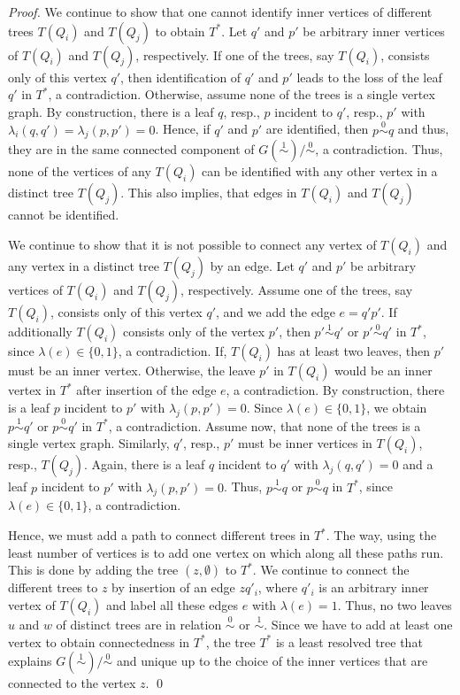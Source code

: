 \documentclass[smallextended]{svjour3}
\newcommand{\Ro}{\mathrel{\overset{0}{\sim}}}
\newcommand{\Rl}{\mathrel{\overset{1}{\sim}}}
\begin{document}
\begin{proof}
  We continue to show that one cannot identify inner vertices of different
  trees $T(Q_i)$ and $T(Q_j)$ to obtain $T^*$.  Let $q'$ and $p'$ be
  arbitrary inner vertices of $T(Q_i)$ and $T(Q_j)$, respectively. If one
  of the trees, say $T(Q_i)$, consists only of this vertex $q'$, then
  identification of $q'$ and $p'$ leads to the loss of the leaf $q'$ in
  $T^*$, a contradiction.  Otherwise, assume none of the trees is a single
  vertex graph.  By construction, there is a leaf $q$, resp., $p$ incident
  to $q'$, resp., $p'$ with $\lambda_i(q,q')=\lambda_j(p,p')=0$.  Hence, if
  $q'$ and $p'$ are identified, then $p\Ro q$ and thus, they are in the
  same connected component of $G(\Rl)/\Ro$, a contradiction.  Thus, none of
  the vertices of any $T(Q_i)$ can be identified with any other vertex in a
  distinct tree $T(Q_j)$.  This also implies, that edges in $T(Q_i)$ and
  $T(Q_j)$ cannot be identified.

  We continue to show that it is not possible to connect any vertex of
  $T(Q_i)$ and any vertex in a distinct tree $T(Q_j)$ by an edge.  Let $q'$
  and $p'$ be arbitrary vertices of $T(Q_i)$ and $T(Q_j)$,
  respectively. Assume one of the trees, say $T(Q_i)$, consists only of
  this vertex $q'$, and we add the edge $e=q'p'$.  If additionally $T(Q_i)$
  consists only of the vertex $p'$, then $p'\Rl q'$ or $p'\Ro q'$ in $T^*$,
  since $\lambda(e)\in \{0,1\}$, a contradiction.  If, $T(Q_i)$ has at
  least two leaves, then $p'$ must be an inner vertex. Otherwise, the leave
  $p'$ in $T(Q_i)$ would be an inner vertex in $T^*$ after insertion of the
  edge $e$, a contradiction.  By construction, there is a leaf $p$
  incident to $p'$ with $\lambda_j(p,p')=0$. Since $\lambda(e)\in \{0,1\}$,
  we obtain $p\Rl q'$ or $p\Ro q'$ in $T^*$, a contradiction.  Assume now,
  that none of the trees is a single vertex graph.  Similarly, $q'$, resp.,
  $p'$ must be inner vertices in $T(Q_i)$, resp., $T(Q_j)$.  Again, there
  is a leaf $q$ incident to $q'$ with $\lambda_j(q,q')=0$ and a leaf $p$
  incident to $p'$ with $\lambda_j(p,p')=0$.  Thus, $p\Rl q$ or $p\Ro q$ in
  $T^*$, since $\lambda(e)\in \{0,1\}$, a contradiction.

  Hence, we must add a path to connect different trees in $T^*$.  The way,
  using the least number of vertices is to add one vertex on which along
  all these paths run. This is done by adding the tree $({z},\emptyset)$ to
  $T^*$.  We continue to connect the different trees to $z$ by insertion of
  an edge $zq'_i$, where $q'_i$ is an arbitrary inner vertex of $T(Q_i)$
  and label all these edges $e$ with $\lambda(e)=1$.  Thus, no two leaves
  $u$ and $w$ of distinct trees are in relation $\Ro$ or $\Rl$.  Since we
  have to add at least one vertex to obtain connectedness in $T^*$, the
  tree $T^*$ is a least resolved tree that explains $G(\Rl)/\Ro$ and unique
  up to the choice of the inner vertices that are connected to the vertex
  $z$.  \qed
\end{proof}
\end{document}
